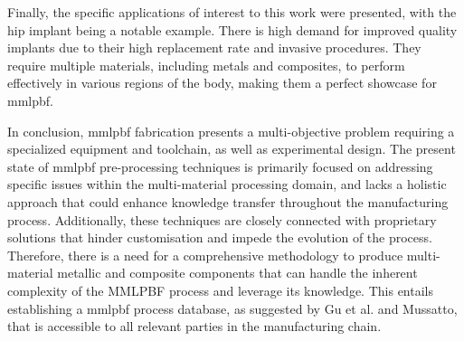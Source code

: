 Finally, the specific applications of interest to this work were presented, with the hip implant being a notable example. There is high demand for improved quality implants due to their high replacement rate and invasive procedures. They require multiple materials, including metals and composites, to perform effectively in various regions of the body, making them a perfect showcase for \gls{mmlpbf}.

In conclusion, \gls{mmlpbf} fabrication presents a multi-objective problem requiring
a specialized equipment and toolchain, as well as experimental design.
The present state of \gls{mmlpbf} pre-processing techniques is primarily focused
on addressing specific issues within the multi-material processing domain, and
lacks a holistic approach that could enhance knowledge transfer throughout the
manufacturing process. Additionally, these techniques are closely connected with
proprietary solutions that hinder customisation and impede the evolution of the
process. Therefore, there is a need for a comprehensive methodology to produce
multi-material metallic and composite components that can handle the inherent
complexity of the MMLPBF process and leverage its knowledge. This entails
establishing a \gls{mmlpbf} process database, as suggested by Gu et al.\cite{gu2012laser} and Mussatto\cite{mussatto2022research}, that is accessible to all relevant parties in the manufacturing chain.

